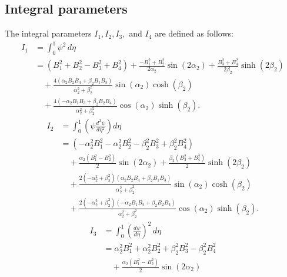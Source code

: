 \documentclass[preprint,12pt]{elsarticle}
\begin{document}
\FloatBarrier
\begin{appendices}
\renewcommand{\theequation}{\thesection.\arabic{equation}}
\section{Integral parameters}\label{appendA}
The integral parameters \( I_1, I_2, I_3, \) and \( I_4 \) are defined as follows:
%
\begin{equation}\label{eq:inte_phi}
	\begin{aligned}
		I_1 &= \int_{0}^{1} \psi^2 \, d\eta \\
		&= (B_1^2 + B_2^2 - B_3^2 + B_4^2) 
		+ \frac{-B_1^2 + B_2^2}{2\alpha_2} \sin(2\alpha_2) 
		+ \frac{B_3^2 + B_4^2}{2\beta_2} \sinh(2\beta_2) \\
		&\quad + \frac{4(\alpha_2 B_2B_4 + \beta_2 B_1B_3)}{\alpha_2^2 + \beta_2^2} \sin(\alpha_2) \cosh(\beta_2) \\
		&\quad + \frac{4(-\alpha_2 B_1B_3 + \beta_2 B_2B_4)}{\alpha_2^2 + \beta_2^2} \cos(\alpha_2) \sinh(\beta_2).
	\end{aligned}
\end{equation}
%
\begin{equation}\label{eq:inte_dphi2}
\begin{split}
	I_2 &= \int_{0}^{1} \left( \psi \frac{d^2 \psi}{d \eta^2} \right) d \eta \\
	&= \left( -\alpha_2^2 B_1^2 - \alpha_2^2 B_2^2 - \beta_2^2 B_3^2 + \beta_2^2 B_4^2 \right) \\
	&\quad + \frac{\alpha_2 (B_1^2 - B_2^2)}{2} \sin(2 \alpha_2) 
	 + \frac{\beta_2 (B_3^2 + B_4^2)}{2} \sinh(2 \beta_2) \\
	&\quad + \frac{2(-\alpha_2^2 + \beta_2^2) (\alpha_2 B_2 B_4 + \beta_2 B_1 B_3)}{\alpha_2^2 + \beta_2^2} \sin(\alpha_2) \cosh(\beta_2) \\
	&\quad + \frac{2(-\alpha_2^2 + \beta_2^2) (-\alpha_2 B_1 B_3 + \beta_2 B_2 B_4)}{\alpha_2^2 + \beta_2^2} \cos(\alpha_2) \sinh(\beta_2).
\end{split}
\end{equation}
%
\begin{equation}\label{eq:inte_dphi3}
	\begin{aligned}
		I_3 &= \int_{0}^{1} \left(\frac{d\psi}{d\eta}\right)^2 \, d\eta \\
		&= \alpha_2^2 B_1^2 + \alpha_2^2 B_2^2 + \beta_2^2 B_3^2 - \beta_2^2 B_4^2 \\
		&\quad + \frac{\alpha_2 (B_1^2 - B_2^2)}{2} \sin(2\alpha_2) 

\end{aligned}
\end{equation}
\end{appendices}
\end{document}

